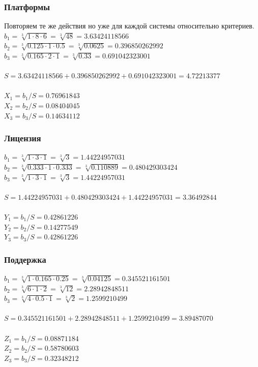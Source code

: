 \documentclass[a4paper,12pt]{report} %
\begin{document}
\subsubsection{Платформы}

Повторяем те же действия но уже для каждой системы относительно критериев.
$ b_1=\sqrt[3]{1 \cdot 8 \cdot 6} = \sqrt[3]{48} = 3.63424118566 $ \\
$ b_2=\sqrt[3]{0.125 \cdot 1 \cdot 0.5} = \sqrt[3]{0.0625} = 0.396850262992 $ \\
$ b_3=\sqrt[3]{0.165 \cdot 2 \cdot 1} = \sqrt[3]{0.33} = 0.691042323001 $ \\
\\
$ S = 3.63424118566 + 0.396850262992 + 0.691042323001 = 4.72213377 $ \\
\\
$ X_1 = b_1/S = 0.76961843 $ \\
$ X_2 = b_2/S = 0.08404045 $ \\
$ X_3 = b_3/S = 0.14634112 $ \\

\subsubsection{Лицензия}

$ b_1=\sqrt[3]{1 \cdot 3 \cdot 1} = \sqrt[3]{3} = 1.44224957031 $ \\
$ b_2=\sqrt[3]{0.333 \cdot 1 \cdot 0.333} = \sqrt[3]{0.110889} = 0.480429303424
$ \\
$ b_3=\sqrt[3]{1 \cdot 3 \cdot 1} = \sqrt[3]{3} = 1.44224957031 $ \\
\\
$ S = 1.44224957031 + 0.480429303424 + 1.44224957031 = 3.36492844 $ \\
\\
$ Y_1 = b_1/S = 0.42861226 $ \\
$ Y_2 = b_2/S = 0.14277549 $ \\
$ Y_3 = b_3/S = 0.42861226 $ \\

\subsubsection{Поддержка}

$ b_1=\sqrt[3]{1 \cdot 0.165 \cdot 0.25} = \sqrt[3]{0.04125} = 0.345521161501 $ \\
$ b_2=\sqrt[3]{6 \cdot 1 \cdot 2} = \sqrt[3]{12} = 2.28942848511 $ \\
$ b_3=\sqrt[3]{4 \cdot 0.5 \cdot 1} = \sqrt[3]{2} = 1.2599210499 $ \\
\\
$ S = 0.345521161501 + 2.28942848511 + 1.2599210499 = 3.89487070 $ \\
\\
$ Z_1 = b_1/S = 0.08871184 $ \\
$ Z_2 = b_2/S = 0.58780603 $ \\
$ Z_3 = b_3/S = 0.32348212 $ \\
\end{document}
